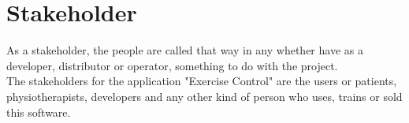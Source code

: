 \section{Stakeholder}
As a stakeholder, the people are called that way in any whether have as a developer, distributor or operator, something to do with the project.
\\[10pt]
The stakeholders for the application "Exercise Control" are the users or patients, physiotherapists, developers and any other kind of person who uses, trains or sold this software.